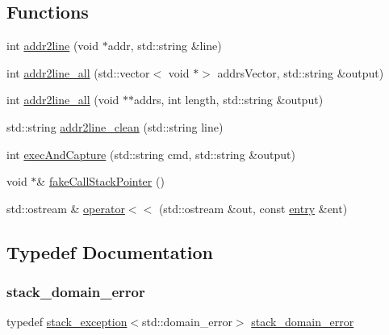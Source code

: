 \subsection*{Functions}
\begin{DoxyCompactItemize}
\item 
int \mbox{\hyperlink{namespacestacktrace_a8ebfe19f3a27f6414cfce5805074fe42}{addr2line}} (void $\ast$addr, std\+::string \&line)
\item 
int \mbox{\hyperlink{namespacestacktrace_a7cf09f4c670f51bba6cb67997b6026ad}{addr2line\+\_\+all}} (std\+::vector$<$ void $\ast$$>$ addrs\+Vector, std\+::string \&output)
\item 
int \mbox{\hyperlink{namespacestacktrace_a179c9d83db84c7fa809a4ab21d580d4b}{addr2line\+\_\+all}} (void $\ast$$\ast$addrs, int length, std\+::string \&output)
\item 
std\+::string \mbox{\hyperlink{namespacestacktrace_a053d4a96859b0cc3ef59c8126a6d9853}{addr2line\+\_\+clean}} (std\+::string line)
\item 
int \mbox{\hyperlink{namespacestacktrace_a0ac07ad3feb21bf6bb2f3728b1ff569d}{exec\+And\+Capture}} (std\+::string cmd, std\+::string \&output)
\item 
void $\ast$\& \mbox{\hyperlink{namespacestacktrace_a30a6d3fa1d0572c74ba3ea308866bba8}{fake\+Call\+Stack\+Pointer}} ()
\item 
std\+::ostream \& \mbox{\hyperlink{namespacestacktrace_a9cdc7f5a1e1c1f53958a3804334ae6c7}{operator$<$$<$}} (std\+::ostream \&out, const \mbox{\hyperlink{structstacktrace_1_1entry}{entry}} \&ent)
\end{DoxyCompactItemize}


\subsection{Typedef Documentation}
\mbox{\label{namespacestacktrace_a771214c95a49f1ddd0fb6c4db59dde48}} 
\subsubsection{\texorpdfstring{stack\+\_\+domain\+\_\+error}{stack\_domain\_error}}
{\footnotesize\ttfamily typedef \mbox{\hyperlink{classstacktrace_1_1stack__exception}{stack\+\_\+exception}}$<$std\+::domain\+\_\+error$>$ \mbox{\hyperlink{namespacestacktrace_a771214c95a49f1ddd0fb6c4db59dde48}{stack\+\_\+domain\+\_\+error}}}

